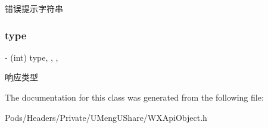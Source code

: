 错误提示字符串 \mbox{\label{interface_base_resp_a88d1e8d553c28f2e1e2078521a6dbefb}} 
\subsubsection{\texorpdfstring{type}{type}}
{\footnotesize\ttfamily -\/ (int) type\hspace{0.3cm}{\ttfamily [read]}, {\ttfamily [write]}, {\ttfamily [nonatomic]}, {\ttfamily [assign]}}

响应类型 

The documentation for this class was generated from the following file\+:\begin{DoxyCompactItemize}
\item 
Pods/\+Headers/\+Private/\+U\+Meng\+U\+Share/W\+X\+Api\+Object.\+h\end{DoxyCompactItemize}
